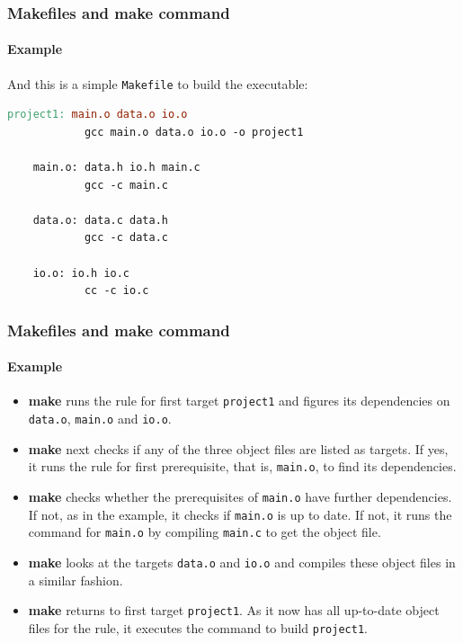 \documentclass[11pt]{beamer}
\begin{document}
\begin{frame}[fragile]
  \frametitle{Makefiles and make command}
  \framesubtitle{Example}

  And this is a simple \texttt{Makefile} to build the executable:

  \vspace{5mm}
  \begin{lstlisting}[language=make, frame=single]
    project1: main.o data.o io.o
            gcc main.o data.o io.o -o project1

    main.o: data.h io.h main.c
            gcc -c main.c

    data.o: data.c data.h
            gcc -c data.c

    io.o: io.h io.c
            cc -c io.c
  \end{lstlisting}
\end{frame}


\begin{frame}[fragile]
  \frametitle{Makefiles and make command}
  \framesubtitle{Example}

  \small{
  \begin{itemize}[<+->]
    \item \textbf{make} runs the rule for first target \texttt{project1} and
      figures its dependencies on \texttt{data.o}, \texttt{main.o} and
      \texttt{io.o}.
    \item \textbf{make} next checks if any of the three object files are
      listed as targets. If yes, it runs the rule for first prerequisite, that
      is, \texttt{main.o}, to find its dependencies.
    \item \textbf{make} checks whether the prerequisites of \texttt{main.o}
      have further dependencies. If not, as in the example, it checks if
      \texttt{main.o} is up to date. If not, it runs the command for
      \texttt{main.o} by compiling \texttt{main.c} to get the object file.
    \item \textbf{make} looks at the targets \texttt{data.o} and \texttt{io.o}
      and compiles these object files in a similar fashion.
    \item \textbf{make} returns to first target \texttt{project1}. As it now
      has all up-to-date object files for the rule, it executes the command to
      build \texttt{project1}.
  \end{itemize}
  }

\end{frame}
\end{document}
